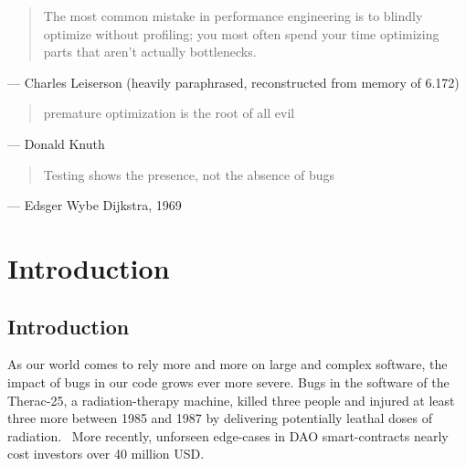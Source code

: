 \begin{quote}
  The most common mistake in performance engineering is to blindly optimize without profiling; you most often spend your time optimizing parts that aren't actually bottlenecks.
\end{quote}
\begin{flushright}
  --- Charles Leiserson (heavily paraphrased, reconstructed from memory of 6.172)
\end{flushright}

\begin{quote}
  premature optimization is the root of all evil
\end{quote}
\begin{flushright}
  --- Donald Knuth~\cite[p.~671]{KnuthPrematureOptimization}
\end{flushright}

\begin{quote}
  Testing shows the presence, not the absence of bugs
\end{quote}
\begin{flushright}
  --- Edsger Wybe Dijkstra, 1969~\cite{naur1969software}
\end{flushright}


\chapter{Introduction}\label{ch:intro}

\section{Introduction}\label{sec:intro:intro}

As our world comes to rely more and more on large and complex software, the impact of bugs in our code grows ever more severe.
Bugs in the software of the Therac-25, a radiation-therapy machine, killed three people and injured at least three more between 1985 and 1987 by delivering potentially leathal doses of radiation.~\cite{Therac}
More recently, unforseen edge-cases in DAO smart-contracts nearly cost investors over 40 million USD.~\cite{DAO2018Guecluetuerk}

